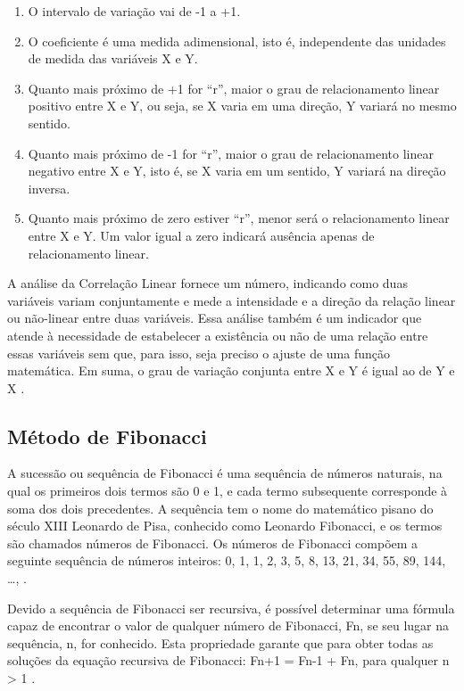 \begin{enumerate}
\item O intervalo de variação vai de -1 a +1.
\item O coeficiente é uma medida adimensional, isto é, independente das unidades de medida das variáveis X e Y.
\item  Quanto mais próximo de +1 for “r”, maior o grau de relacionamento linear positivo entre X e Y, ou seja, se X varia em uma direção, Y variará no mesmo sentido.
\item Quanto mais próximo de -1 for “r”, maior o grau de relacionamento linear negativo entre X e Y, isto é, se X varia em um sentido, Y variará na direção inversa.
\item Quanto mais próximo de zero estiver “r”, menor será o relacionamento linear entre X e Y. Um valor igual a zero indicará ausência apenas de relacionamento linear.
\end{enumerate}

A análise da Correlação Linear fornece um número, indicando como duas variáveis variam conjuntamente e mede a intensidade e a direção da relação linear ou não-linear entre duas variáveis. Essa análise também é um indicador que atende à necessidade de estabelecer a existência ou não de uma relação entre essas variáveis sem que, para isso, seja preciso o ajuste de uma função matemática. Em suma, o grau de variação conjunta entre X e Y é igual ao de Y e X \cite[pág.~65]{lira2004}.

\subsection{Método de Fibonacci}

A sucessão ou sequência de Fibonacci é uma sequência de números naturais, na qual os primeiros dois termos são 0 e 1, e cada termo subsequente corresponde à soma dos dois precedentes. A sequência tem o nome do matemático pisano do século XIII Leonardo de Pisa,  conhecido como Leonardo Fibonacci, e os termos são chamados números de Fibonacci. Os números de Fibonacci compõem a seguinte sequência de números inteiros: 0, 1, 1, 2, 3, 5, 8, 13, 21, 34, 55, 89, 144, …, \cite[pág.~6]{gagliardi2013}.

Devido a sequência de Fibonacci ser recursiva, é possível determinar uma fórmula capaz de encontrar o valor de qualquer número de Fibonacci, Fn, se seu lugar na sequência, n, for conhecido. Esta propriedade garante que para obter todas as soluções da equação recursiva de Fibonacci: Fn+1 = Fn-1 + Fn, para qualquer n > 1 \cite[pág.~12]{sousa2012}.


